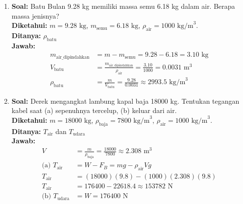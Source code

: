 \documentclass[twocolumn]{article}
\begin{document}
\begin{enumerate}
    \item \textbf{Soal:} Batu Bulan 9.28 kg memiliki massa semu 6.18 kg dalam air. Berapa massa jenisnya? \\
    \textbf{Diketahui:} $m = 9.28 \text{ kg}$, $m_{\text{semu}} = 6.18 \text{ kg}$, $\rho_{\text{air}} = 1000 \text{ kg/m}^3$. \\
    \textbf{Ditanya:} $\rho_{\text{batu}}$ \\
    \textbf{Jawab:}
    \begin{align*}
        m_{\text{air\_dipindahkan}} &= m - m_{\text{semu}} = 9.28 - 6.18 = 3.10 \text{ kg} \\
        V_{\text{batu}} &= \frac{m_{\text{air\_dipindahkan}}}{\rho_{\text{air}}} = \frac{3.10}{1000} = 0.0031 \text{ m}^3 \\
        \rho_{\text{batu}} &= \frac{m}{V_{\text{batu}}} = \frac{9.28}{0.0031} \approx 2993.5 \text{ kg/m}^3
    \end{align*}

    \item \textbf{Soal:} Derek mengangkat lambung kapal baja 18000 kg. Tentukan tegangan kabel saat (a) sepenuhnya tercelup, (b) keluar dari air. \\
    \textbf{Diketahui:} $m = 18000 \text{ kg}$, $\rho_{\text{baja}} = 7800 \text{ kg/m}^3$, $\rho_{\text{air}} = 1000 \text{ kg/m}^3$. \\
    \textbf{Ditanya:} $T_{\text{air}}$ dan $T_{\text{udara}}$ \\
    \textbf{Jawab:}
    \begin{align*}
        V &= \frac{m}{\rho_{\text{baja}}} = \frac{18000}{7800} \approx 2.308 \text{ m}^3 \\
        \text{(a) } T_{\text{air}} &= W - F_B = mg - \rho_{\text{air}} V g \\
        T_{\text{air}} &= (18000)(9.8) - (1000)(2.308)(9.8) \\
        T_{\text{air}} &= 176400 - 22618.4 \approx 153782 \text{ N} \\
        \text{(b) } T_{\text{udara}} &= W = 176400 \text{ N}
    \end{align*}


\end{enumerate}
\end{document}
